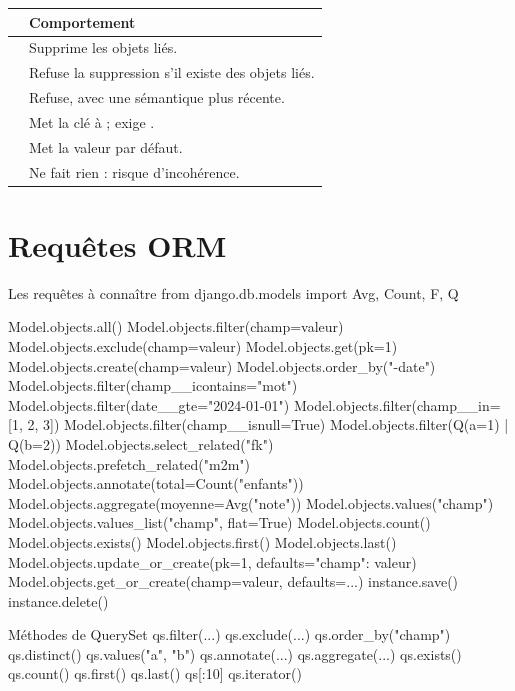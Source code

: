 \begin{longtable}{L{3.3cm} L{11.9cm}}
\toprule
\textbf{} & \textbf{Comportement} \\
\midrule
\endhead
{} & Supprime les objets liés. \\
 & Refuse la suppression s'il existe des objets liés. \\
 & Refuse, avec une sémantique plus récente. \\
 & Met la clé à  ; exige . \\
 & Met la valeur par défaut. \\
 & Ne fait rien : risque d'incohérence. \\
\bottomrule
\end{longtable}

\section{Requêtes ORM}

\begin{codebox}[python]{Les requêtes à connaître}
from django.db.models import Avg, Count, F, Q

Model.objects.all()
Model.objects.filter(champ=valeur)
Model.objects.exclude(champ=valeur)
Model.objects.get(pk=1)
Model.objects.create(champ=valeur)
Model.objects.order_by("-date")
Model.objects.filter(champ__icontains="mot")
Model.objects.filter(date__gte="2024-01-01")
Model.objects.filter(champ__in=[1, 2, 3])
Model.objects.filter(champ__isnull=True)
Model.objects.filter(Q(a=1) | Q(b=2))
Model.objects.select_related("fk")
Model.objects.prefetch_related("m2m")
Model.objects.annotate(total=Count("enfants"))
Model.objects.aggregate(moyenne=Avg("note"))
Model.objects.values("champ")
Model.objects.values_list("champ", flat=True)
Model.objects.count()
Model.objects.exists()
Model.objects.first()
Model.objects.last()
Model.objects.update_or_create(pk=1, defaults={"champ": valeur})
Model.objects.get_or_create(champ=valeur, defaults={...})
instance.save()
instance.delete()
\end{codebox}

\begin{codebox}[python]{Méthodes de QuerySet}
qs.filter(...)
qs.exclude(...)
qs.order_by("champ")
qs.distinct()
qs.values("a", "b")
qs.annotate(...)
qs.aggregate(...)
qs.exists()
qs.count()
qs.first()
qs.last()
qs[:10]
qs.iterator()
\end{codebox}

